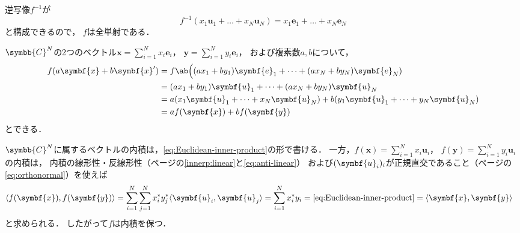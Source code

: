 \documentclass[
]{sotsu}
\begin{document}
\quad
逆写像$f^{-1}$が
\begin{equation*}
    f^{-1} (x_1 \symbf{u}_1 + \dots + x_N \symbf{u}_N)
        = x_1 \symbf{e}_1 + \dots + x_N \symbf{e}_N
\end{equation*}
と構成できるので，
$f$は全単射である．


\quad 
$\symbb{C}^N$の2つのベクトル$\symbf{x} = \sum_{i = 1}^{N} x_i \symbf{e}_i$，
$\symbf{y} = \sum_{i = 1}^{N} y_i \symbf{e}_i$，
および複素数$a, b$について，
\begin{equation*}
    \begin{split}
        f(a \symbf{x} + b \symbf{x}')
            &= f \ab\Big(
                    (a x_1 + b y_1) \symbf{e}_1
                    + \dots + 
                    (a x_N + b y_N) \symbf{e}_N
                )
            \\
            &= (a x_1 + b y_1) \symbf{u}_1
                + \dots + 
                (a x_N + b y_N) \symbf{u}_N
            \\
            &= a (x_1 \symbf{u}_1 + \dots + x_N \symbf{u}_N)
             + b (y_1 \symbf{u}_1 + \dots + y_N \symbf{u}_N)
            \\
            &= a f(\symbf{x}) + b f(\symbf{y})
    \end{split}
\end{equation*}
とできる．


\quad
$\symbb{C}^N$に属するベクトルの内積は，\cref{eq:Euclidean-inner-product}の形で書ける．
一方，$f(\symbf{x}) = \sum_{i = 1}^{N} x_i \symbf{u}_i$，
$f(\symbf{y}) = \sum_{i = 1}^{N} y_i \symbf{u}_i$の内積は，
内積の線形性・反線形性（\pageref{innerp:linear}ページの\cref{innerp:linear}と\cref{eq:anti-linear}）
および$\sequ{\symbf{u}_i}[i]$が正規直交であること（\pageref{eq:orthonormal}ページの\cref{eq:orthonormal}）を使えば
\begin{equation*}
    \begin{split}
        \iparen{ f(\symbf{x}), f(\symbf{y}) }
        &= \sum_{i = 1}^{N} \sum_{j = 1}^{N}
            \conj{x_i} \conj{y_j}
            \iparen{\symbf{u}_i, \symbf{u}_j}
        = \sum_{i = 1}^{N} \conj{x_i} y_i
        = \text{\cref{eq:Euclidean-inner-product}}
        = \iparen{\symbf{x}, \symbf{y}}
    \end{split}
\end{equation*}
と求められる．
したがって$f$は内積を保つ．
\end{document}
